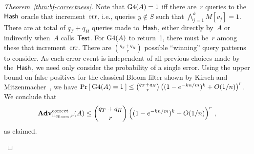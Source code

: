 \begin{proof}[Theorem~\ref{thm:bf-correctness}]
Note that $\text{G4}(A)=1$ iff there are~$r$ queries to the
$\mathsf{Hash}$ oracle that increment~$\mathrm{err}$, i.e., queries $y \not\in
S$ such that $\bigwedge_{j=1}^{k} M[v_j]=1$.
There are at total of $q_T + q_H$ queries made to~$\mathsf{Hash}$,
either directly by~$A$ or indirectly when~$A$ calls~$\mathsf{Test}$.
For $\game{4}(A)$ to return~1, there must be~$r$ among these that
increment~$\mathrm{err}$. %
There are $\binom{q_T+q_H}{r}$ possible ``winning'' query patterns
to consider.   As each error event is independent of all previous
choices made by the~$\mathsf{Hash}$, we need only consider the
probability of a single error. Using the upper bound on false
positives for the classical Bloom filter shown by Kirsch and
Mitzenmacher~\cite{kirsch2006less}, we have $\Pr\left[\: \text{G4}(A)=1 \:\right]
\leq \binom{q_T+q_H}{r}\left( (1-e^{-kn/m})^k + O(1/n) \right)^r$.
We conclude that
\[
\mathrm{\mathbf{Adv}}^{\mathrm{correct}}_{\Pi_{\mathrm{Bloom}},r}(A) \leq  {\dbinom{q_T + q_H}{r}} \left( (1-e^{-kn/m})^k + O(1/n) \right)^r\,,
\]
as claimed.
\begin{figure}[tp]
\fpage{.9}{
\hpagessl{.45}{.5}
{
\underline{$\game{4}(A)$} \\ %
$S \getsr A$; $\err \gets 0$;  $\calC \gets \emptyset$\\
$(\pubaux,\privaux) \getsr \Rep^{\HashOracle}(S)$\\
$\bot \getsr A^{\TestOracle,\HashOracle}(\pubaux)$\\
if $\err  < r$ then Return 0\\
Return 1\\

}}
\end{figure}
\end{proof}
